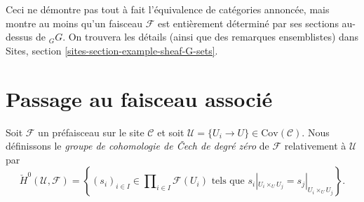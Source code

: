 Ceci ne d\'emontre pas tout \`a fait l'\'equivalence de cat\'egories annonc\'ee, mais montre au
moins qu'un faisceau $\mathcal{F}$ est enti\`erement d\'etermin\'e par ses sections au-dessus de
${}_G G$. On trouvera les d\'etails (ainsi que des remarques ensemblistes) dans
Sites, section \ref{sites-section-example-sheaf-G-sets}.




\section{Passage au faisceau associ\'e}
\label{section-sheafification}

\begin{definition}
\label{definition-0-cech}
Soit $\mathcal{F}$ un pr\'efaisceau sur le site $\mathcal{C}$ et soit
$\mathcal{U} = \{U_i \to U\} \in \text{Cov} (\mathcal{C})$.
Nous d\'efinissons le {\it groupe de cohomologie de {\v C}ech de degr\'e z\'ero} de
$\mathcal{F}$ relativement \`a $\mathcal{U}$ par
$$
\check H^0 (\mathcal{U}, \mathcal{F}) =
\left\{
(s_i)_{i\in I} \in \prod\nolimits_{i\in I }\mathcal{F}(U_i)
\text{ tels que }
s_i|_{U_i \times_U U_j} = s_j |_{U_i \times_U U_j}
\right\}.
$$
\end{definition}

